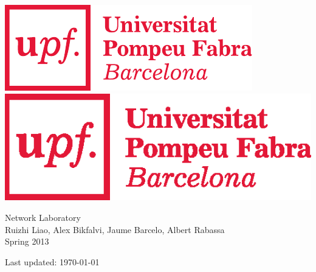 \begin{titlepage}
\begin{center}

%

\ifpdf
\includegraphics[width=0.3\linewidth]{Figures/Logo.pdf}\\[9cm]
\else
\includegraphics[width=0.3\linewidth]{Figures/Logo.eps}\\[9cm]
\fi

\textsf{\Huge Network Laboratory}\\[1cm]

\textsf{Ruizhi Liao, Alex Bikfalvi, Jaume Barcelo, Albert Rabassa}\\[1cm]

\textsf{Spring 2013}

\vfill

\textsf{Last updated: \today}

\end{center}
\end{titlepage}